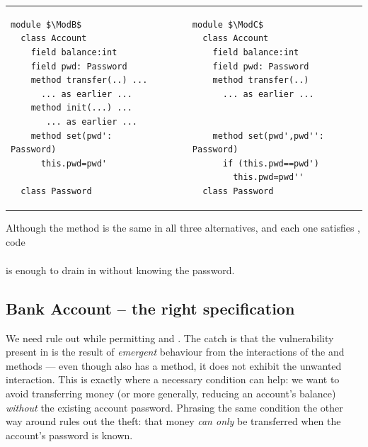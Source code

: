 \begin{tabular}{lll}
\begin{minipage}[b]{0.42\textwidth}
\begin{lstlisting}[mathescape=true, language=chainmail, frame=lines]
module $\ModB$
  class Account
    field balance:int 
    field pwd: Password 
    method transfer(..) ...
      ... as earlier ...
    method init(...) ...
       ... as earlier ...
    method set(pwd': Password)
      this.pwd=pwd'
      
  class Password
\end{lstlisting}
\end{minipage}
&\ \ \  \ \   &%
\begin{minipage}[b]{0.45\textwidth}
\begin{lstlisting}[mathescape=true, language=chainmail, frame=lines]
module $\ModC$
  class Account
    field balance:int 
    field pwd: Password 
    method transfer(..) 
      ... as earlier ...
    
    
    method set(pwd',pwd'': Password)
      if (this.pwd==pwd') 
        this.pwd=pwd''
  class Password
\end{lstlisting}
\end{minipage} 
\end{tabular}

Although the  method is the same in
all three alternatives, and each one satisfies \Sclassic,
code 
\\ 
$\ \strut \hspace{.2in} $ 
\\ 
is enough to drain   in \ModB without knowing the password.


 \subsection{Bank Account -- the right specification}
\label{s:bankSpecEx}

We need  rule out \ModB while permitting \ModA and
\ModC. The catch is that the vulnerability present in \ModB is the result
of  \emph{emergent} behaviour from the interactions of the 
and  methods --- even though \ModC also has a
 method, it does not exhibit the unwanted interaction.
This is exactly where a necessary condition can help:
we want to avoid transferring money
(or more generally, reducing an account's balance)
\textit{without} the existing account password.  Phrasing the same condition
the other way around %
rules out the theft: that money \textit{can only} be
transferred when the account's password is known.


